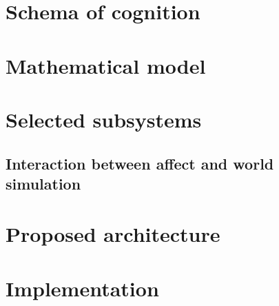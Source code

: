 \documentclass[]{scrartcl}
\begin{document}


\section{Schema of cognition}\label{sec:schemaOfCognition}



\section{Mathematical model}\label{sec:mathematicalModel}



\section{Selected subsystems}\label{sec:selectedSubsystems}



\subsection{Interaction between affect and world simulation}



\section{Proposed architecture}\label{sec:proposedArchitecture}


\section{Implementation}



\endgroup

\pagebreak

\nocite{*}



\end{document}
